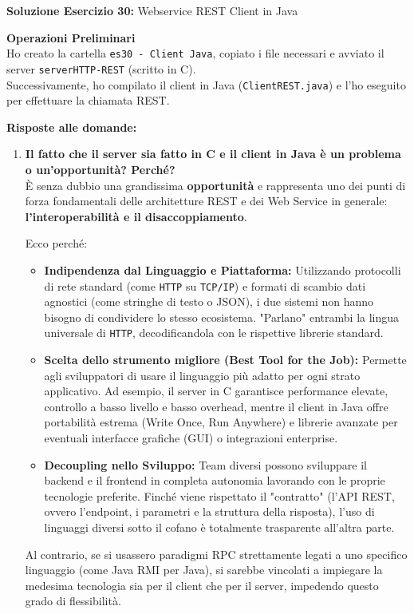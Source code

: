 \documentclass[11pt]{article}
\begin{document}
\begin{tcolorbox}[colback=green!5!white,colframe=green!75!black,title=\textbf{RISPOSTA}, breakable]
\textbf{Soluzione Esercizio 30:} Webservice REST Client in Java

\textbf{Operazioni Preliminari}\\
Ho creato la cartella \texttt{es30 - Client Java}, copiato i file necessari e avviato il server \texttt{serverHTTP-REST} (scritto in C).\\
Successivamente, ho compilato il client in Java (\texttt{ClientREST.java}) e l'ho eseguito per effettuare la chiamata REST.

\textbf{Risposte alle domande:}

\begin{enumerate}
    \item \textbf{Il fatto che il server sia fatto in C e il client in Java è un problema o un’opportunità? Perché?}\\
    È senza dubbio una grandissima \textbf{opportunità} e rappresenta uno dei punti di forza fondamentali delle architetture REST e dei Web Service in generale: \textbf{l'interoperabilità e il disaccoppiamento}.
    
    Ecco perché:
    \begin{itemize}
        \item \textbf{Indipendenza dal Linguaggio e Piattaforma:} Utilizzando protocolli di rete standard (come \texttt{HTTP} su \texttt{TCP/IP}) e formati di scambio dati agnostici (come stringhe di testo o JSON), i due sistemi non hanno bisogno di condividere lo stesso ecosistema. "Parlano" entrambi la lingua universale di \texttt{HTTP}, decodificandola con le rispettive librerie standard.
        \item \textbf{Scelta dello strumento migliore (Best Tool for the Job):} Permette agli sviluppatori di usare il linguaggio più adatto per ogni strato applicativo. Ad esempio, il server in C garantisce performance elevate, controllo a basso livello e basso overhead, mentre il client in Java offre portabilità estrema (Write Once, Run Anywhere) e librerie avanzate per eventuali interfacce grafiche (GUI) o integrazioni enterprise.
        \item \textbf{Decoupling nello Sviluppo:} Team diversi possono sviluppare il backend e il frontend in completa autonomia lavorando con le proprie tecnologie preferite. Finché viene rispettato il "contratto" (l'API REST, ovvero l'endpoint, i parametri e la struttura della risposta), l'uso di linguaggi diversi sotto il cofano è totalmente trasparente all'altra parte.
    \end{itemize}
    Al contrario, se si usassero paradigmi RPC strettamente legati a uno specifico linguaggio (come Java RMI per Java), si sarebbe vincolati a impiegare la medesima tecnologia sia per il client che per il server, impedendo questo grado di flessibilità.
\end{enumerate}


\end{tcolorbox}
\end{document}
